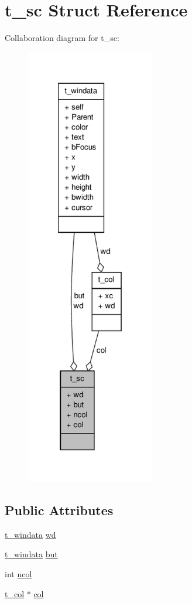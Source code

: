 \hypertarget{structt__sc}{\section{t\-\_\-sc \-Struct \-Reference}
\label{structt__sc}
}


\-Collaboration diagram for t\-\_\-sc\-:
\nopagebreak
\begin{figure}[H]
\begin{center}
\leavevmode
\includegraphics[height=550pt]{structt__sc__coll__graph}
\end{center}
\end{figure}
\subsection*{\-Public \-Attributes}
\begin{DoxyCompactItemize}
\item 
\hyperlink{structt__windata}{t\-\_\-windata} \hyperlink{structt__sc_a7fe36812402fa881d1f79ee81e069f5f}{wd}
\item 
\hyperlink{structt__windata}{t\-\_\-windata} \hyperlink{structt__sc_a2293d9b539fcd335f5bb184911f966fc}{but}
\item 
int \hyperlink{structt__sc_acfebce96708b67c3e2528233b29f0552}{ncol}
\item 
\hyperlink{structt__col}{t\-\_\-col} $\ast$ \hyperlink{structt__sc_ad0c8c5ad688a38599a2347e1a9f004cc}{col}
\end{DoxyCompactItemize}


